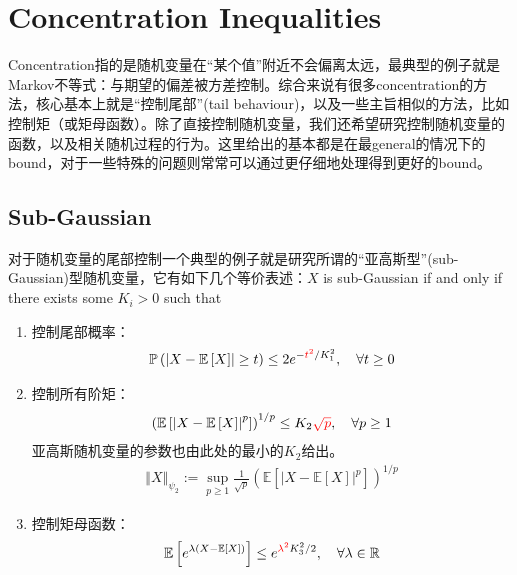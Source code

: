 \documentclass[11pt,a4paper]{ctexart}
\numberwithin{equation}{section}%
\begin{document}
       





    





\section{Concentration Inequalities}

Concentration指的是随机变量在“某个值”附近不会偏离太远，最典型的例子就是Markov不等式：与期望的偏差被方差控制。综合来说有很多concentration的方法，核心基本上就是“控制尾部”(tail behaviour)，以及一些主旨相似的方法，比如控制矩（或矩母函数）。除了直接控制随机变量，我们还希望研究控制随机变量的函数，以及相关随机过程的行为。这里给出的基本都是在最general的情况下的bound，对于一些特殊的问题则常常可以通过更仔细地处理得到更好的bound。


\subsection{Sub-Gaussian}


对于随机变量的尾部控制一个典型的例子就是研究所谓的“亚高斯型”(sub-Gaussian)型随机变量，它有如下几个等价表述：$X$ is sub-Gaussian if and only if there exists some $K_i>0$ such that
\begin{enumerate}[topsep=2pt,itemsep=2pt]
    \item 控制尾部概率：
    \begin{align*}
        \mathbb{P}\left( \left\vert X - \mathbb{E}\left[ X \right] \right\vert \geq t \right)  \leq 2e^{- {\color{red}t^2}/K_1^2},\quad \forall t \geq 0
    \end{align*}
    \item 控制所有阶矩：
    \begin{align*}
        \left( \mathbb{E}\left[ \left\vert X - \mathbb{E}\left[ X \right]  \right\vert^p \right] \right)^{1/p} \leq K_2{\color{red}\sqrt{p}},\quad \forall p \geq 1 
    \end{align*}
    亚高斯随机变量的参数也由此处的最小的$K_2$给出。
    \begin{align*}
        \left\Vert X \right\Vert _{\psi_2} := \sup_{p\geq 1} \frac{1}{\sqrt{p}} \left( \mathbb{E}\left[ \left\vert X - \mathbb{E}\left[ X \right]  \right\vert^p \right] \right)^{1/p}
    \end{align*}
    \item 控制矩母函数：
    \begin{align*}
        \mathbb{E}\left[ e^{\lambda\left( X - \mathbb{E}\left[ X \right] \right)} \right] \leq e^{{\color{red}\lambda^2}K_3^2/2},\quad \forall \lambda \in \mathbb{R} 
    \end{align*}
\end{enumerate}
\end{document}

